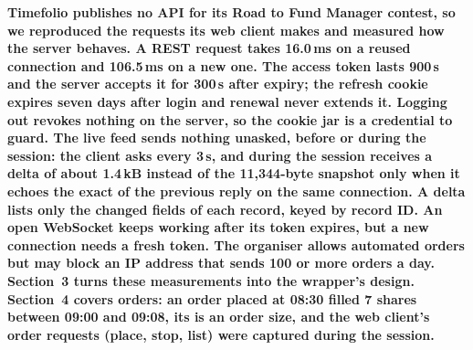 \documentclass[9pt]{article}
\newcommand{\code}[1]{{\ttfamily\detokenize{#1}}}
\newcommand{\ms}{\,ms}
\begin{document}
\par
{\color{navy}\fontsize{10}{12.8}\selectfont\bfseries Timefolio publishes no API for its Road to Fund Manager contest, so we reproduced the requests its web client makes and measured how the server behaves. A REST request takes 16.0\ms{} on a reused connection and 106.5\ms{} on a new one. The access token lasts 900\,s and the server accepts it for 300\,s after expiry; the refresh cookie expires seven days after login and renewal never extends it. Logging out revokes nothing on the server, so the cookie jar is a credential to guard. The live feed sends nothing unasked, before or during the session: the client asks every 3\,s, and during the session receives a delta of about 1.4\,kB instead of the 11,344-byte snapshot only when it echoes the exact \code{t} of the previous reply on the same connection. A delta lists only the changed fields of each record, keyed by record ID. An open WebSocket keeps working after its token expires, but a new connection needs a fresh token. The organiser allows automated orders but may block an IP address that sends 100 or more orders a day. Section~3 turns these measurements into the wrapper's design. Section~4 covers orders: an order placed at 08:30 filled 7 shares between 09:00 and 09:08, its \code{wei} is an order size, and the web client's order requests (place, stop, list) were captured during the session.\par}
\vspace{4pt}
\end{document}
